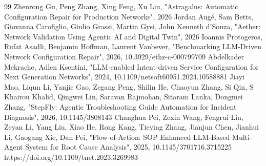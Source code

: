 \documentclass[conference]{IEEEtran}
\begin{document}
\begin{thebibliography}{99}
 Zhenrong Gu, Peng Zhang, Xing Feng, Xu Liu, "Astragalus: Automatic Configuration Repair for Production Networks", 2026
 Jordan Augé, Sam Betts, Giovanna Carofiglio, Giulio Grassi, Martin Gysi, John Kenneth d'Souza, "Aether: Network Validation Using Agentic AI and Digital Twin", 2026
 Ioannis Protogeros, Rufat Asadli, Benjamin Hoffman, Laurent Vanbever, "Benchmarking LLM-Driven Network Configuration Repair", 2026, 10.3929/ethz-c-000799709
 Abdelkader Mekrache, Adlen Ksentini, "LLM-enabled Intent-driven Service Configuration for Next Generation Networks", 2024, 10.1109/netsoft60951.2024.10588881
 Jiayi Mao, Liqun Li, Yanjie Gao, Zegang Peng, Shilin He, Chaoyun Zhang, Si Qin, S Khairou Khalid, Qingwei Lin, Saravan Rajmohan, Sitaram Lanka, Dongmei Zhang, "StepFly: Agentic Troubleshooting Guide Automation for Incident Diagnosis", 2026, 10.1145/3808143
 Changhua Pei, Zexin Wang, Fengrui Liu, Zeyan Li, Yang Liu, Xiao He, Rong Kang, Tieying Zhang, Jianjun Chen, Jianhui Li, Gaogang Xie, Dan Pei, "Flow-of-Action: SOP Enhanced LLM-Based Multi-Agent System for Root Cause Analysis", 2025, 10.1145/3701716.3715225
 https://doi.org/10.1109/tnet.2023.3269983
\end{thebibliography}
\end{document}
